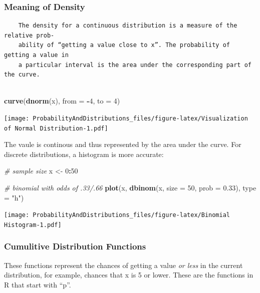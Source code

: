 \documentclass[]{article}
\newenvironment{Shaded}{\begin{snugshade}}{\end{snugshade}}
\newcommand{\KeywordTok}[1]{\textcolor[rgb]{0.13,0.29,0.53}{\textbf{#1}}}
\newcommand{\DataTypeTok}[1]{\textcolor[rgb]{0.13,0.29,0.53}{#1}}
\newcommand{\DecValTok}[1]{\textcolor[rgb]{0.00,0.00,0.81}{#1}}
\newcommand{\FloatTok}[1]{\textcolor[rgb]{0.00,0.00,0.81}{#1}}
\newcommand{\StringTok}[1]{\textcolor[rgb]{0.31,0.60,0.02}{#1}}
\newcommand{\CommentTok}[1]{\textcolor[rgb]{0.56,0.35,0.01}{\textit{#1}}}
\newcommand{\OperatorTok}[1]{\textcolor[rgb]{0.81,0.36,0.00}{\textbf{#1}}}
\newcommand{\NormalTok}[1]{#1}
\begin{document}
\subsubsection{Meaning of Density}\label{meaning-of-density}

\begin{verbatim}
    The density for a continuous distribution is a measure of the relative prob-
    ability of “getting a value close to x”. The probability of getting a value in
    a particular interval is the area under the corresponding part of the curve.
    
\end{verbatim}

\begin{Shaded}
\begin{Highlighting}[]
\KeywordTok{curve}\NormalTok{(}\KeywordTok{dnorm}\NormalTok{(x), }\DataTypeTok{from =} \OperatorTok{-}\DecValTok{4}\NormalTok{, }\DataTypeTok{to =} \DecValTok{4}\NormalTok{)}
\end{Highlighting}
\end{Shaded}

\texttt{[image: ProbabilityAndDistributions\_files/figure-latex/Visualization of Normal Distribution-1.pdf]}

The vaule is continous and thus represented by the area under the curve.
For discrete distributions, a histogram is more accurate:

\begin{Shaded}
\begin{Highlighting}[]
\CommentTok{# sample size}
\NormalTok{x <-}\StringTok{ }\DecValTok{0}\OperatorTok{:}\DecValTok{50}

\CommentTok{# binomial with odds of .33/.66}
\KeywordTok{plot}\NormalTok{(x, }\KeywordTok{dbinom}\NormalTok{(x, }\DataTypeTok{size =} \DecValTok{50}\NormalTok{, }\DataTypeTok{prob =} \FloatTok{0.33}\NormalTok{), }\DataTypeTok{type =} \StringTok{"h"}\NormalTok{)}
\end{Highlighting}
\end{Shaded}

\texttt{[image: ProbabilityAndDistributions\_files/figure-latex/Binomial Histogram-1.pdf]}

\subsubsection{Cumulitive Distribution
Functions}\label{cumulitive-distribution-functions}

These functions represent the chances of getting a value \emph{or less}
in the current distribution, for example, chances that x is 5 or lower.
These are the functions in R that start with ``p''.
\end{document}
